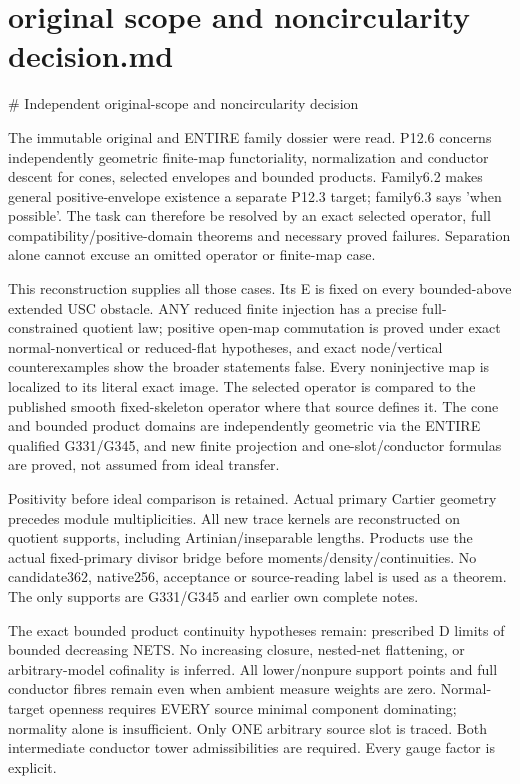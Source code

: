 \documentclass[11pt]{article}
\begin{document}
\section{original scope and noncircularity decision.md}
\begin{ReviewBody}
# Independent original-scope and noncircularity decision

The immutable original and ENTIRE family dossier were read. P12.6 concerns independently geometric finite-map functoriality, normalization and conductor descent for cones, selected envelopes and bounded products. Family6.2 makes general positive-envelope existence a separate P12.3 target; family6.3 says 'when possible'. The task can therefore be resolved by an exact selected operator, full compatibility/positive-domain theorems and necessary proved failures. Separation alone cannot excuse an omitted operator or finite-map case.

This reconstruction supplies all those cases. Its E is fixed on every bounded-above extended USC obstacle. ANY reduced finite injection has a precise full-constrained quotient law; positive open-map commutation is proved under exact normal-nonvertical or reduced-flat hypotheses, and exact node/vertical counterexamples show the broader statements false. Every noninjective map is localized to its literal exact image. The selected operator is compared to the published smooth fixed-skeleton operator where that source defines it. The cone and bounded product domains are independently geometric via the ENTIRE qualified G331/G345, and new finite projection and one-slot/conductor formulas are proved, not assumed from ideal transfer.

Positivity before ideal comparison is retained. Actual primary Cartier geometry precedes module multiplicities. All new trace kernels are reconstructed on quotient supports, including Artinian/inseparable lengths. Products use the actual fixed-primary divisor bridge before moments/density/continuities. No candidate362, native256, acceptance or source-reading label is used as a theorem. The only supports are G331/G345 and earlier own complete notes.

The exact bounded product continuity hypotheses remain: prescribed D limits of bounded decreasing NETS. No increasing closure, nested-net flattening, or arbitrary-model cofinality is inferred. All lower/nonpure support points and full conductor fibres remain even when ambient measure weights are zero. Normal-target openness requires EVERY source minimal component dominating; normality alone is insufficient. Only ONE arbitrary source slot is traced. Both intermediate conductor tower admissibilities are required. Every gauge factor is explicit.


\end{ReviewBody}
\end{document}
